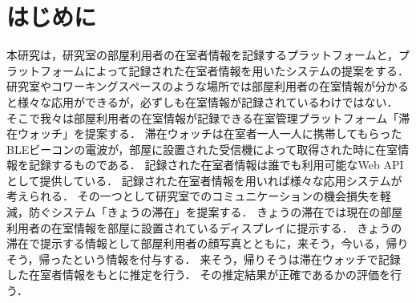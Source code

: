 \thispagestyle{myheadings}


\chapter{はじめに}\label{1}
本研究は，研究室の部屋利用者の在室者情報を記録するプラットフォームと，プラットフォームによって記録された在室者情報を用いたシステムの提案をする．
研究室やコワーキングスペースのような場所では部屋利用者の在室情報が分かると様々な応用ができるが，必ずしも在室情報が記録されているわけではない．
そこで我々は部屋利用者の在室情報が記録できる在室管理プラットフォーム「滞在ウォッチ」を提案する．
滞在ウォッチは在室者一人一人に携帯してもらったBLEビーコンの電波が，部屋に設置された受信機によって取得された時に在室情報を記録するものである．
記録された在室者情報は誰でも利用可能なWeb APIとして提供している．
記録された在室者情報を用いれば様々な応用システムが考えられる．
その一つとして研究室でのコミュニケーションの機会損失を軽減，防ぐシステム「きょうの滞在」を提案する．
きょうの滞在では現在の部屋利用者の在室情報を部屋に設置されているディスプレイに提示する．
きょうの滞在で提示する情報として部屋利用者の顔写真とともに，来そう，今いる，帰りそう，帰ったという情報を付与する．
来そう，帰りそうは滞在ウォッチで記録した在室者情報をもとに推定を行う．
その推定結果が正確であるかの評価を行う．



